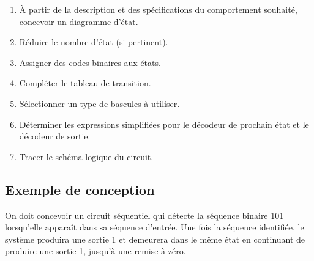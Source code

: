 \documentclass[11pt]{article}
\begin{document}
\begin{enumerate}
\item À partir de la description et des spécifications du comportement
souhaité, concevoir un diagramme d'état.
\item Réduire le nombre d'état (si pertinent).
\item Assigner des codes binaires aux états.
\item Compléter le tableau de transition.
\item Sélectionner un type de bascules à utiliser.
\item Déterminer les expressions simplifiées pour le décodeur de prochain
état et le décodeur de sortie.
\item Tracer le schéma logique du circuit.
\end{enumerate}

\subsection{Exemple de conception}
\label{sec:orgcf0b33b}

On doit concevoir un circuit séquentiel qui détecte la séquence
binaire 101 lorsqu'elle apparaît dans sa séquence d'entrée. Une fois
la séquence identifiée, le système produira une sortie 1 et demeurera
dans le même état en continuant de produire une sortie 1, jusqu'à une
remise à zéro.
\end{document}
